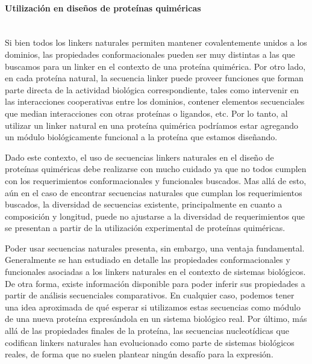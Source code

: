\paragraph{Utilización en diseños de proteínas quiméricas} \hspace{0pt} \\ \indent 
Si bien todos los linkers naturales permiten mantener covalentemente unidos a los dominios, 
las propiedades conformacionales pueden ser muy distintas a las que buscamos para un linker en el contexto de una proteína quimérica.
Por otro lado, en cada proteína natural, la secuencia linker puede proveer funciones que forman parte directa de la actividad biológica correspondiente, 
tales como intervenir en las interacciones cooperativas entre los dominios, contener elementos secuenciales que median interacciones con otras proteínas o ligandos, etc.
Por lo tanto, al utilizar un linker natural en una proteína quimérica podríamos estar agregando un módulo biológicamente funcional a la proteína que estamos diseñando.

Dado este contexto, el uso de secuencias linkers naturales en el diseño de proteínas quiméricas debe realizarse con mucho cuidado ya que no todos cumplen con los requerimientos conformacionales y funcionales buscados.
Mas allá de esto, aún en el caso de encontrar secuencias naturales que cumplan los requerimientos buscados, la diversidad de secuencias existente, principalmente en cuanto a composición y longitud, puede no ajustarse a la diversidad de 
requerimientos que se presentan a partir de la utilización experimental de proteínas quiméricas. %

Poder usar secuencias naturales presenta, sin embargo, una ventaja fundamental. 
Generalmente se han estudiado en detalle las propiedades conformacionales y funcionales asociadas a los linkers naturales en el contexto de sistemas biológicos.
De otra forma, existe información disponible para poder inferir sus propiedades a partir de análisis secuenciales comparativos. 
En cualquier caso, podemos tener una idea aproximada de qué esperar si utilizamos estas secuencias como módulo de una nueva proteína expresándola en un sistema biológico real.
Por último, más allá de las propiedades finales de la proteína, las secuencias nucleotídicas que codifican linkers naturales han evolucionado como parte de sistemas biológicos reales,
de forma que no suelen plantear ningún desafío para la expresión.















